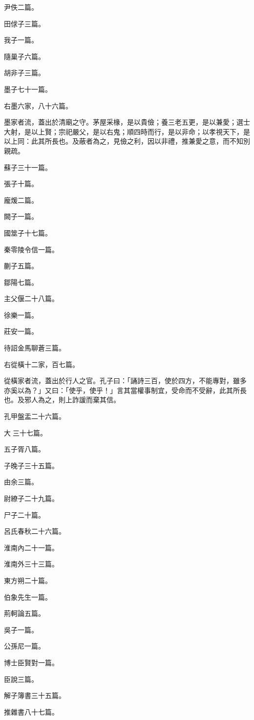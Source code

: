 \begin{pinyinscope}
尹佚二篇。

田俅子三篇。

我子一篇。

隨巢子六篇。

胡非子三篇。

墨子七十一篇。

右墨六家，八十六篇。

墨家者流，蓋出於清廟之守。茅屋采椽，是以貴儉；養三老五更，是以兼愛；選士大射，是以上賢；宗祀嚴父，是以右鬼；順四時而行，是以非命；以孝視天下，是以上同：此其所長也。及蔽者為之，見儉之利，因以非禮，推兼愛之意，而不知別親疏。

蘇子三十一篇。

張子十篇。

龐煖二篇。

闕子一篇。

國筮子十七篇。

秦零陵令信一篇。

蒯子五篇。

鄒陽七篇。

主父偃二十八篇。

徐樂一篇。

莊安一篇。

待詔金馬聊蒼三篇。

右從橫十二家，百七篇。

從橫家者流，蓋出於行人之官。孔子曰：「誦詩三百，使於四方，不能專對，雖多亦奚以為？」又曰：「使乎，使乎！」言其當權事制宜，受命而不受辭，此其所長也。及邪人為之，則上詐諼而棄其信。

孔甲盤盂二十六篇。

大𢁰三十七篇。

五子胥八篇。

子晚子三十五篇。

由余三篇。

尉繚子二十九篇。

尸子二十篇。

呂氏春秋二十六篇。

淮南內二十一篇。

淮南外三十三篇。

東方朔二十篇。

伯象先生一篇。

荊軻論五篇。

吳子一篇。

公孫尼一篇。

博士臣賢對一篇。

臣說三篇。

解子簿書三十五篇。

推雜書八十七篇。


\end{pinyinscope}
